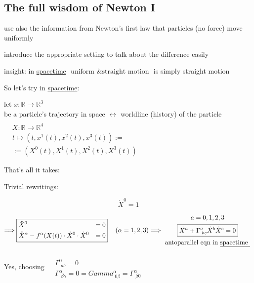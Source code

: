\subsection{The full wisdom of Newton I}

use also the information from Newton's first law that particles (no force) move uniformly 

introduce the appropriate setting to talk about the difference easily

insight: in \underline{spacetime} $\boxed{ \text{ uniform \& straight motion }}$ is simply straight motion

So let's try in \underline{spacetime}: 

let $x: \mathbb{R} \to \mathbb{R}^3$ \\
\phantom{\quad } be a particle's trajectory in space $\longleftrightarrow $ worldline (history) of the particle $\begin{aligned} & \quad \\
  & X : \mathbb{R} \to \mathbb{R}^4  \\
  & t\mapsto (t, x^1(t), x^2(t),x^3(t)) := \\
  & := (X^0(t), X^1(t),X^2(t),X^3(t)) \end{aligned}$

That's all it takes:

Trivial rewritings:

\[
\dot{X}^0 =1
\]

\[
\Longrightarrow \boxed{ \begin{aligned}
  & \ddot{X}^0 & = 0 \\ 
  & \ddot{X}^{\alpha} - f^{\alpha}(X(t))\cdot \dot{X}^0 \cdot \dot{X}^0 & =0 
\end{aligned} } \quad \, (\alpha = 1,2,3)  \Longrightarrow \begin{gathered}
  a = 0,1,2,3 \\
  \boxed{ \ddot{X}^a + \Gamma^a_{ \, \, bc}\dot{X}^b \dot{X}^c = 0 } \\
  \text{ antoparallel eqn in \underline{spacetime } }
\end{gathered}
\]

Yes, choosing $\begin{aligned} & \quad \\
  & \Gamma^0_{ \, \, ab} = 0 \\
  & \Gamma^{\alpha}_{ \, \, \beta \gamma} = 0 =Gamma^{\alpha}_{\,\, 0\beta} = \Gamma^{\alpha}_{ \, \, \beta 0}\end{aligned}$

